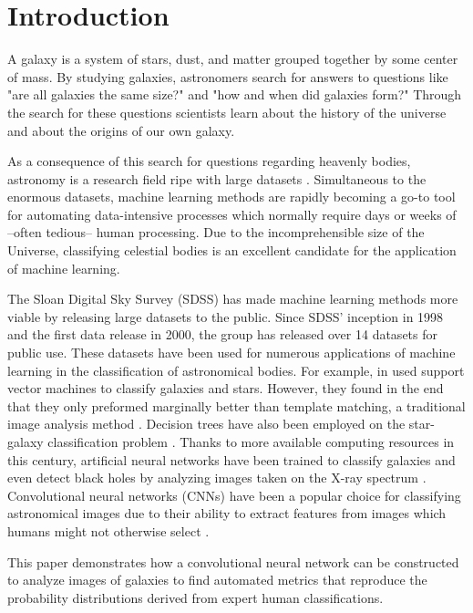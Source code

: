 \section{Introduction}

A galaxy is a system of stars, dust, and matter grouped together by some center of mass. By studying galaxies, astronomers search for answers to questions like "are all galaxies the same size?" and "how and when did galaxies form?" Through the search for these questions scientists learn about the history of the universe and about the origins of our own galaxy.


As a consequence of this search for questions regarding heavenly bodies, astronomy is a research field ripe with large datasets \cite{microsoft-galaxies}. Simultaneous to the enormous datasets, machine learning methods are rapidly becoming a go-to tool for automating data-intensive processes which normally require days or weeks of --often tedious-- human processing. Due to the incomprehensible size of the Universe, classifying celestial bodies is an excellent candidate for the application of machine learning.

The Sloan Digital Sky Survey (SDSS) has made machine learning methods more viable by releasing large datasets to the public. Since SDSS' inception in 1998 and the first data release in 2000, the group has released over 14 datasets for public use. These datasets have been used for numerous applications of machine learning in the classification of astronomical bodies. For example, \citeauthor{svn-galaxy} in \citeyear{svn-galaxy} used support vector machines to classify galaxies and stars. However, they found in the end that they only preformed marginally better than template matching, a traditional image analysis method \cite{svn-galaxy}. Decision trees have also been employed on the star-galaxy classification problem \cite{ball-decision-trees}. Thanks to more available computing resources in this century, artificial neural networks have been trained to classify galaxies and even detect black holes by analyzing images taken on the X-ray spectrum \cite{black-holes}. Convolutional neural networks (CNNs) have been a popular choice for classifying astronomical images due to their ability to extract features from images which humans might not otherwise select \cite{cnn-star-galaxy}.

This paper demonstrates how a convolutional neural network can be constructed to analyze images of galaxies to find automated metrics that reproduce the probability distributions derived from expert human classifications.

